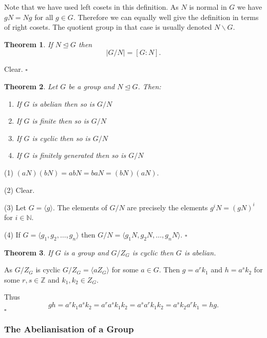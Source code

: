 \documentclass[10pt]{article}
\newcommand{\Z}{\mathbb{Z}}
\newtheorem{theorem}{Theorem}[section]
\newenvironment{proof}[1][Proof]{\begin{trivlist}
\item[\hskip \labelsep {\itshape #1}]}{\end{trivlist}}
\begin{document}
Note that we have used left cosets in this definition. As $N$ is normal in $G$ we have $gN = Ng$ for all $g \in G$. Therefore we can equally well give the definition in terms of right cosets. The quotient group in that case is usually denoted $N\backslash G$.

\begin{theorem}
If $N \mathrel{\unlhd} G$ then
$$|G/N| = [G:N].$$
\end{theorem}

\begin{proof}
Clear. $\square$
\end{proof}

\begin{theorem}
Let $G$ be a group and $N \mathrel{\unlhd} G$. Then:
\begin{enumerate}
\item If $G$ is abelian then so is $G/N$
\item If $G$ is finite then so is $G/N$
\item If $G$ is cyclic then so is $G/N$
\item If $G$ is finitely generated then so is $G/N$
\end{enumerate}
\end{theorem}

\begin{proof}
(1) $(aN)(bN) = abN = baN = (bN)(aN)$.

(2) Clear.

(3) Let $G = \langle g \rangle$. The elements of $G/N$ are precisely the elements $g^iN = (gN)^i$ for $i \in \mathbb{N}$.

(4) If $G = \langle g_1, g_2, \ldots, g_n \rangle$ then $G/N = \langle g_1N, g_2N, \ldots, g_nN \rangle$. $\square$
\end{proof}

\begin{theorem}
If $G$ is a group and $G/Z_G$ is cyclic then $G$ is abelian.
\end{theorem}

\begin{proof}
As $G/Z_G$ is cyclic $G/Z_G = \langle aZ_G \rangle$ for some $a \in G$. Then $g = a^rk_1$ and $h = a^sk_2$ for some $r, s \in \Z$ and $k_1, k_2 \in Z_G$.

Thus
$$gh = a^rk_1a^sk_2 = a^ra^sk_1k_2 = a^sa^rk_1k_2 = a^sk_2a^rk_1 = hg.$$ $\square$
\end{proof}

\subsubsection{The Abelianisation of a Group}
\end{document}
